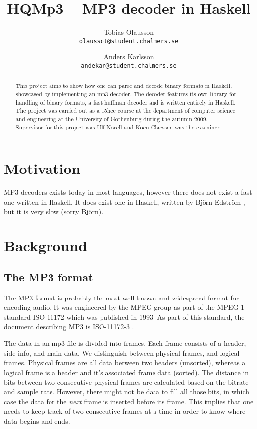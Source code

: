 \documentclass[a4paper,12pt]{article}
\title{HQMp3 -- MP3 decoder in Haskell}
\author{Tobias Olausson \\ \texttt{\small{olaussot@student.chalmers.se}} \and
        Anders Karlsson \\ \texttt{\small{andekar@student.chalmers.se}}
}
\date{ \rule{0.8 \linewidth}{0.5mm} \\[3mm]
       University of Gothenburg \\
       \small{\today}
}
\begin{document}
\maketitle

\begin{abstract}
    This project aims to show how one can parse and decode binary formats in
    Haskell, showcased by implementing an mp3 decoder. The decoder features its
    own library for handling of binary formats, a fast huffman decoder and is
    written entirely in Haskell. The project was carried out as a 15hec course
    at the department of computer science and engineering at the University of
    Gothenburg during the autumn 2009. \\

    Supervisor for this project was Ulf Norell and Koen Claessen was the
    examiner.
\end{abstract}

\newpage
\tableofcontents
\newpage

\section{Motivation}
    MP3 decoders exists today in most languages, however there does not exist
    a fast one written in Haskell. It does exist one in Haskell, written by 
    Björn Edström \cite{bjorn}, but it is very slow (sorry Björn).

\section{Background}
    \subsection{The MP3 format}
       The MP3 format is probably the most well-known and widespread format for
       encoding audio. It was engineered by the MPEG group as part of the MPEG-1
       standard ISO-11172 which was published in 1993. As part of this standard,
       the document describing MP3 is ISO-11172-3 \cite{wikimp3,wikimpeg1}.

       The data in an mp3 file is divided into frames. Each frame consists of
       a header, side info, and main data. We distinguish between physical
       frames, and logical frames. Physical frames are all data between two
       headers (unsorted), whereas a logical frame is a header and it's
       associated frame data (sorted). The distance in bits between two
       consecutive physical frames are calculated based on the bitrate and sample
       rate. However, there might not be data to fill all those bits, in which
       case the data for the \textit{next} frame is inserted before its frame.
       This implies that one needs to keep track of two consecutive frames at a
       time in order to know where data begins and ends.
\end{document}
